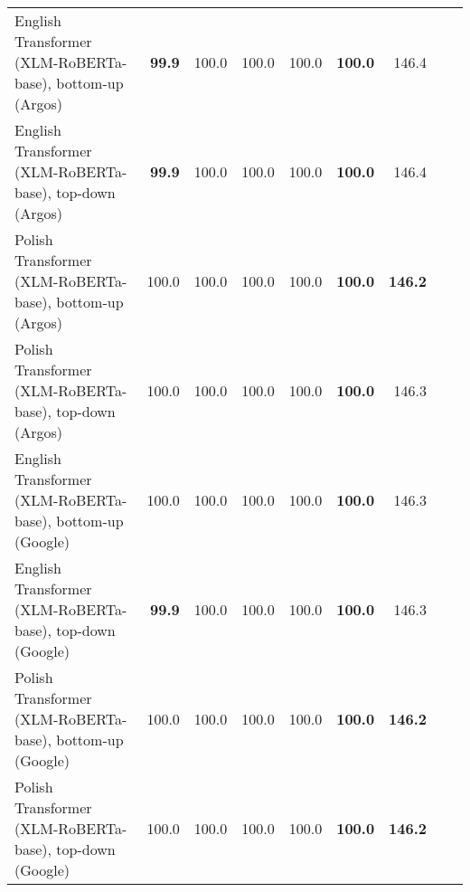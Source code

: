 \begin{table}[ht!]
{\begin{tabular}{lrrrrrrrr}
  English Transformer (XLM-RoBERTa-base), bottom-up (Argos) & \textbf{99.9} & 100.0 & 100.0 & 100.0 & \textbf{100.0} & 146.4 \\ 
  English Transformer (XLM-RoBERTa-base), top-down (Argos) & \textbf{99.9} & 100.0 & 100.0 & 100.0 & \textbf{100.0} & 146.4 \\ 
  Polish Transformer (XLM-RoBERTa-base), bottom-up (Argos) & 100.0 & 100.0 & 100.0 & 100.0 & \textbf{100.0} & \textbf{146.2} \\ 
  Polish Transformer (XLM-RoBERTa-base), top-down (Argos) & 100.0 & 100.0 & 100.0 & 100.0 & \textbf{100.0} & 146.3 \\ 
  English Transformer (XLM-RoBERTa-base), bottom-up (Google) & 100.0 & 100.0 & 100.0 & 100.0 & \textbf{100.0} & 146.3 \\ 
  English Transformer (XLM-RoBERTa-base), top-down (Google) & \textbf{99.9} & 100.0 & 100.0 & 100.0 & \textbf{100.0} & 146.3 \\ 
  Polish Transformer (XLM-RoBERTa-base), bottom-up (Google) & 100.0 & 100.0 & 100.0 & 100.0 & \textbf{100.0} & \textbf{146.2} \\ 
  Polish Transformer (XLM-RoBERTa-base), top-down (Google) & 100.0 & 100.0 & 100.0 & 100.0 & \textbf{100.0} & \textbf{146.2} \\ 
   \hline
\end{tabular}
}
\end{table}




